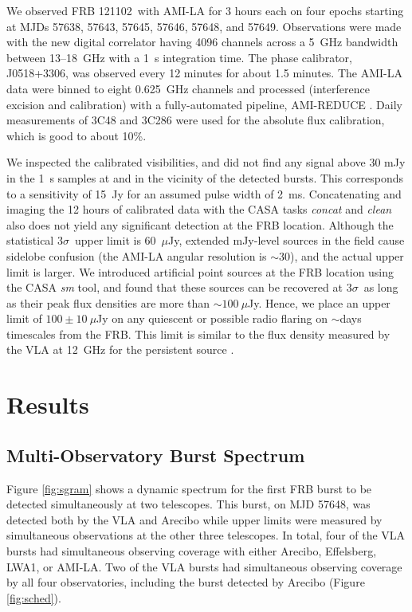 \documentclass[twocolumn]{aastex61}
\newcommand{\frb}{FRB 121102}
\begin{document}
We observed \frb\ with AMI-LA for 3 hours each on four epochs starting at MJDs 57638, 57643, 57645, 57646, 57648, and 57649. Observations were made with the new digital correlator having 4096 channels across a 5~GHz bandwidth between 13--18~GHz with a 1~s integration time. The phase calibrator, J0518+3306, was observed every 12 minutes for about 1.5 minutes. The AMI-LA data were binned to eight 0.625~GHz channels and processed (interference excision and calibration) with a fully-automated pipeline, AMI-REDUCE \citep[e.g.,][]{2013MNRAS.429.3330P}. Daily measurements of 3C48 and 3C286 were used for the absolute flux calibration, which is good to about 10\%. 

We inspected the calibrated visibilities, and did not find any signal above 30 mJy in the 1~s samples at and in the vicinity of the detected bursts. This corresponds to a sensitivity of 15~Jy for an assumed pulse width of 2~ms. Concatenating and imaging the 12 hours of calibrated data with the CASA tasks {\it concat} and {\it clean} also does not yield any significant detection at the FRB location. Although the statistical $3\sigma$\ upper limit is 60~$\mu$Jy, extended mJy-level sources in the field cause sidelobe confusion (the AMI-LA angular resolution is $\sim$30\arcsec), and the actual upper limit is larger. We introduced artificial point sources at the FRB location using the CASA {\it sm} tool, and found that these sources can be recovered at $3\sigma$\ as long as their peak flux densities are more than $\sim100~\mu$Jy. Hence, we place an upper limit of $100\pm10~\mu$Jy on any quiescent or possible radio flaring on $\sim$days timescales from the FRB. This limit is similar to the flux density measured by the VLA at 12~GHz for the persistent source \citep{LOC}.

\section{Results}
\label{sec:res}

\subsection{Multi-Observatory Burst Spectrum}

Figure \ref{fig:sgram} shows a dynamic spectrum for the first FRB burst to be detected simultaneously at two telescopes. This burst, on MJD 57648, was detected both by the VLA and Arecibo while upper limits were measured by simultaneous observations at the other three telescopes. In total, four of the VLA bursts had simultaneous observing coverage with either Arecibo, Effelsberg, LWA1, or AMI-LA. Two of the VLA bursts had simultaneous observing coverage by all four observatories, including the burst detected by Arecibo (Figure \ref{fig:sched}).
\end{document}
